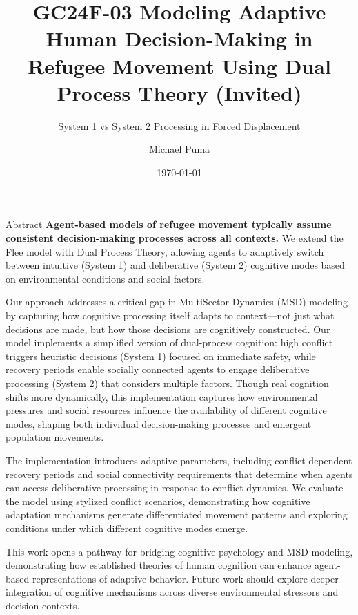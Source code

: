 \documentclass[aspectratio=169]{beamer}
\title[GC24F-03]{GC24F-03 Modeling Adaptive Human Decision-Making in Refugee Movement Using Dual Process Theory (Invited)}
\subtitle{System 1 vs System 2 Processing in Forced Displacement}
\author{Michael Puma}
\institute{Columbia University Climate School\\Center for Climate Systems Research}
\date{\today}
\begin{document}
\begin{frame}
\titlepage
\end{frame}

\begin{frame}{Abstract}
\small
\textbf{Agent-based models of refugee movement typically assume consistent decision-making processes across all contexts.} We extend the Flee model with Dual Process Theory, allowing agents to adaptively switch between intuitive (System 1) and deliberative (System 2) cognitive modes based on environmental conditions and social factors.

\vspace{0.5em}

Our approach addresses a critical gap in MultiSector Dynamics (MSD) modeling by capturing how cognitive processing itself adapts to context—not just what decisions are made, but how those decisions are cognitively constructed. Our model implements a simplified version of dual-process cognition: high conflict triggers heuristic decisions (System 1) focused on immediate safety, while recovery periods enable socially connected agents to engage deliberative processing (System 2) that considers multiple factors. Though real cognition shifts more dynamically, this implementation captures how environmental pressures and social resources influence the availability of different cognitive modes, shaping both individual decision-making processes and emergent population movements.

\vspace{0.5em}

The implementation introduces adaptive parameters, including conflict-dependent recovery periods and social connectivity requirements that determine when agents can access deliberative processing in response to conflict dynamics. We evaluate the model using stylized conflict scenarios, demonstrating how cognitive adaptation mechanisms generate differentiated movement patterns and exploring conditions under which different cognitive modes emerge.

\vspace{0.5em}

This work opens a pathway for bridging cognitive psychology and MSD modeling, demonstrating how established theories of human cognition can enhance agent-based representations of adaptive behavior. Future work should explore deeper integration of cognitive mechanisms across diverse environmental stressors and decision contexts.
\end{frame}
\end{document}
